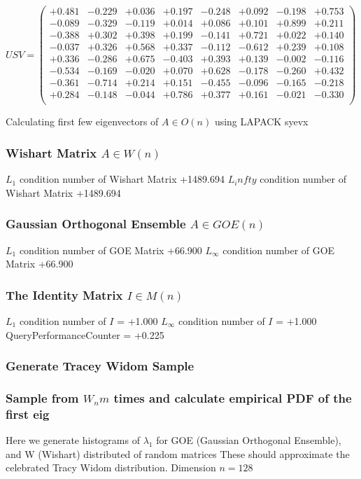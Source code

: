 \documentclass[9pt]{article}
\theoremstyle{plain}
\theoremstyle{definition}
\theoremstyle{remark}
\numberwithin{equation}{section}
\begin{document}
$U S V = \left(
\begin{array}{
cccccccc}
+0.481 & -0.229 & +0.036 & +0.197 & -0.248 & +0.092 & -0.198 & +0.753 \\
-0.089 & -0.329 & -0.119 & +0.014 & +0.086 & +0.101 & +0.899 & +0.211 \\
-0.388 & +0.302 & +0.398 & +0.199 & -0.141 & +0.721 & +0.022 & +0.140 \\
-0.037 & +0.326 & +0.568 & +0.337 & -0.112 & -0.612 & +0.239 & +0.108 \\
+0.336 & -0.286 & +0.675 & -0.403 & +0.393 & +0.139 & -0.002 & -0.116 \\
-0.534 & -0.169 & -0.020 & +0.070 & +0.628 & -0.178 & -0.260 & +0.432 \\
-0.361 & -0.714 & +0.214 & +0.151 & -0.455 & -0.096 & -0.165 & -0.218 \\
+0.284 & -0.148 & -0.044 & +0.786 & +0.377 & +0.161 & -0.021 & -0.330 \\
\end{array}
\right)$ \newline 

Calculating first few eigenvectors of $A \in O(n)$ using LAPACK syevx

\subsubsection{Wishart Matrix $A \in W(n)$}
$L_1$ condition number of Wishart Matrix +1489.694
$L_infty$ condition number of Wishart Matrix +1489.694
\subsubsection{Gaussian Orthogonal Ensemble $A \in GOE(n)$}
$L_1$ condition number of GOE Matrix +66.900
$L_\infty$ condition number of GOE Matrix +66.900
\subsubsection{The Identity Matrix $I \in M(n)$}
$L_1$ condition number of $I$ = +1.000
$L_\infty$ condition number of $I$ = +1.000
QueryPerformanceCounter  =  +0.225
\subsubsection{Generate Tracey Widom Sample}
\subsubsection{Sample from $W_n m$ times and calculate empirical PDF of the first eig}
Here we generate histograms of $\lambda_1$ for GOE (Gaussian Orthogonal Ensemble), and W (Wishart) 		 distributed of random matrices
These should approximate the celebrated Tracy Widom distribution.
Dimension $n = 128$
\end{document}
